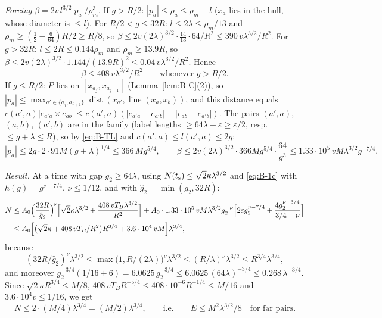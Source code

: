 \emph{Forcing} $\beta=2v\,l^{3/2}|p_a|/\rho_m^3$. If $g>R/2$: $|p_a|\le\rho_a\le\rho_m+l$ ($x_a$ lies in the hull, whose diameter is
$\le l$). For $R/2<g\le32R$: $l\le2\lambda\le\rho_m/13$ and $\rho_m\ge(\frac12-\frac6{64})R/2\ge R/8$, so
$\beta\le2v(2\lambda)^{3/2}\cdot\frac{14}{13}\cdot64/R^2\le390\,v\lambda^{3/2}/R^2$. For $g>32R$: $l\le2R\le0.144\rho_m$ and
$\rho_m\ge13.9R$, so $\beta\le2v(2\lambda)^{3/2}\cdot1.144/(13.9R)^2\le0.04\,v\lambda^{3/2}/R^2$. Hence
\[
\beta\le408\,v\lambda^{3/2}/R^2\qquad\text{whenever }g>R/2 .
\]
If $g\le R/2$: $P$ lies on $[x_{a_j},x_{a_{j+1}}]$ (Lemma~\ref{lem:B-C}(2)), so
$|p_a|\le\max_{a'\in\{a_j,a_{j+1}\}}\operatorname{dist}(x_{a'},\operatorname{line}(x_a,x_b))$, and this distance equals
$c(a',a)|e_{a'a}\times e_{ab}|\le c(a',a)(|e_{a'a}-e_{a'b}|+|e_{ab}-e_{a'b}|)$. The pairs $(a',a)$, $(a,b)$, $(a',b)$ are in the
family (label lengths $\ge64\lambda-\varepsilon\ge\varepsilon/2$, resp.\ $\le g+\lambda\le R$), so by \eqref{eq:B-TL} and
$c(a',a)\le l(a',a)\le2g$:
\[
|p_a|\le2g\cdot2\cdot91M(g+\lambda)^{1/4}\le366\,Mg^{5/4},\qquad
\beta\le2v(2\lambda)^{3/2}\cdot366Mg^{5/4}\cdot\frac{64}{g^3}\le1.33\cdot10^5\,vM\lambda^{3/2}g^{-7/4}.
\]

\emph{Result.} At a time with gap $g_2\ge64\lambda$, using $N(t_{\mathrm s})\le\sqrt2\kappa\lambda^{3/2}$ and \eqref{eq:B-1c} with
$h(g)=g^{\nu-7/4}$, $\nu\le1/12$, and with $\hat g_2=\min(g_2,32R)$:
\begin{align*}
N&\le A_0\Bigl(\frac{32R}{\hat g_2}\Bigr)^{\!\nu}\Bigl[\sqrt2\kappa\lambda^{3/2}+\frac{408\,vT_B\lambda^{3/2}}{R^2}\Bigr]
+A_0\cdot1.33\cdot10^5\,vM\lambda^{3/2}g_2^{-\nu}\Bigl[2\varepsilon g_2^{\nu-7/4}+\frac{4g_2^{\nu-3/4}}{3/4-\nu}\Bigr]\\
&\le A_0\Bigl[\bigl(\sqrt2\kappa+408\,vT_B/R^2\bigr)R^{3/4}+3.6\cdot10^4\,vM\Bigr]\lambda^{3/4},
\end{align*}
because
\[
(32R/\hat g_2)^\nu\lambda^{3/2}\le\max\bigl(1,R/(2\lambda)\bigr)^\nu\lambda^{3/2}\le(R/\lambda)^\nu\lambda^{3/2}\le
R^{3/4}\lambda^{3/4},
\]
and moreover
$g_2^{-3/4}(1/16+6)=6.0625\,g_2^{-3/4}\le6.0625\,(64\lambda)^{-3/4}\le0.268\,\lambda^{-3/4}$. Since $\sqrt2\kappa R^{3/4}\le M/8$,
$408\,vT_BR^{-5/4}\le408\cdot10^{-6}R^{-1/4}\le M/16$ and $3.6\cdot10^4v\le1/16$, we get
\[
N\le2\cdot(M/4)\lambda^{3/4}=(M/2)\lambda^{3/4},\qquad\text{i.e.}\qquad E\le M^2\lambda^{3/2}/8\quad\text{for far pairs.}
\]

